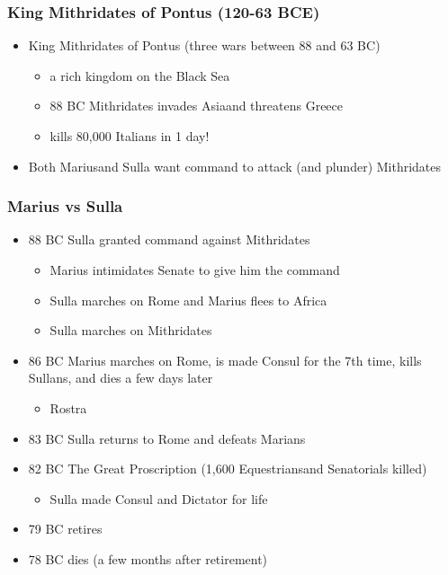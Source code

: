 \documentclass[12pt, twoside]{article}
\begin{document}
\subsubsection{King Mithridates of Pontus (120-63 BCE)}
\begin{itemize}
\item King Mithridates of Pontus (three wars between 88 and 63 BC)
	\begin{itemize}
	\item a rich kingdom on the Black Sea
	\item 88 BC Mithridates invades Asiaand threatens Greece
	\item kills 80,000 Italians in 1 day!
	\end{itemize}
\item Both Mariusand Sulla want command to attack (and plunder) Mithridates
\end{itemize}	

\subsubsection{Marius vs Sulla}
\begin{itemize}
\item 88 BC Sulla granted command against Mithridates
	\begin{itemize}
	\item Marius intimidates Senate to give him the command
	\item Sulla marches on Rome and Marius flees to Africa
	\item Sulla marches on Mithridates
	\end{itemize}
\item 86 BC Marius marches on Rome, is made Consul for the 7th time, kills Sullans, and dies a few days later
	\begin{itemize}
	\item Rostra
	\end{itemize}
\item 83 BC Sulla returns to Rome and defeats Marians
\item 82 BC The Great Proscription (1,600 Equestriansand Senatorials killed)
	\begin{itemize}
	\item Sulla made Consul and Dictator for life
	\end{itemize}
\item 79 BC retires
\item 78 BC dies (a few months after retirement)
\end{itemize}
\end{document}
